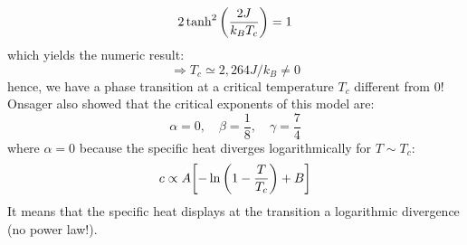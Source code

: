 \documentclass[../../Main/Main.tex]{subfiles}
\begin{document}
\begin{equation*}
\begin{equation*}
  2 \tanh^2 \qty(\frac{2J}{k_B T_c}) = 1 
\end{equation*}
 which yields the numeric result:
 \begin{equation*} \Rightarrow T_c \simeq 2,264 J/k_B \neq 0
\end{equation*}
hence, we have a phase transition at a critical temperature \(T_c\) different from 0!
Onsager also showed that the critical exponents of this model are:
\begin{equation*}
\alpha =0,\quad \beta=\frac{1}{8}, \quad \gamma = \frac{7}{4}
\end{equation*}
where \(\alpha=0\)  because the specific heat diverges logarithmically for \(T \sim T_c\):
\begin{equation*}
  c \propto A \qty[-\ln{\qty(1- \frac{T}{T_c}) } + B  ]
\end{equation*}
It means that the specific heat displays at the transition a logarithmic divergence (no power law!).
\end{document}
